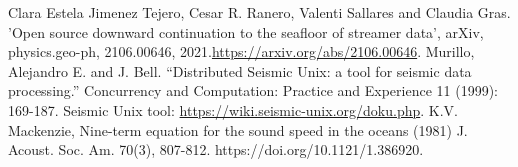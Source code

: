 \documentclass[11pt, oneside]{article}   	%
\begin{document}
\begin{thebibliography}{999}

 Clara Estela Jimenez Tejero, Cesar R. Ranero, Valenti Sallares and Claudia Gras. 'Open source downward continuation to the seafloor of streamer data', arXiv, physics.geo-ph, 2106.00646, 2021.\url{https://arxiv.org/abs/2106.00646}.
Murillo, Alejandro E. and J. Bell. “Distributed Seismic Unix: a tool for seismic data processing.” Concurrency and Computation: Practice and Experience 11 (1999): 169-187. Seismic Unix tool: \url{https://wiki.seismic-unix.org/doku.php}.
K.V. Mackenzie, Nine-term equation for the sound speed in the oceans (1981) J. Acoust. Soc. Am. 70(3), 807-812. https://doi.org/10.1121/1.386920.
\end{thebibliography}
\end{document}
